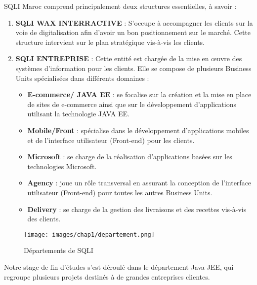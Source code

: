 
\vspace{0.5cm}
\indent SQLI Maroc comprend principalement deux structures essentielles, à savoir :

\begin{enumerate}
    \item \textbf{SQLI WAX INTERRACTIVE} : S’occupe à accompagner les clients sur la voie de digitalisation afin d’avoir un bon positionnement sur le marché. Cette structure
     intervient sur le plan stratégique vis-à-vis les clients.
     \item \textbf{SQLI ENTREPRISE} : Cette entité est chargée de la mise en œuvre des systèmes d'information pour les clients. Elle se compose de plusieurs Business Units spécialisées dans différents domaines :
\begin{itemize}

    \item \textbf{E-commerce/ JAVA EE} : se focalise sur la création et la mise en place de sites de e-commerce ainsi que sur le développement d'applications utilisant la technologie JAVA EE.
    \item \textbf{Mobile/Front} : spécialise dans le développement d'applications mobiles et de l'interface utilisateur (Front-end) pour les clients.
     \item \textbf{Microsoft} : se charge de la réalisation d'applications basées sur les technologies Microsoft.
      \item \textbf{Agency} : joue un rôle transversal en assurant la conception de l'interface utilisateur (Front-end) pour toutes les autres Business Units.
        \item \textbf{Delivery} : se charge de la gestion des livraisons et des recettes vis-à-vis des clients.       
\end{itemize}
\end{enumerate}
\vspace{0.5cm}
\begin{figure}[H]  
  \centering  
  \texttt{[image: images/chap1/departement.png]}
  \caption{Départements de SQLI}
  \label{Over The Air updates}
\end{figure}

\indent  Notre stage de fin d'études s'est déroulé dans le département Java JEE, qui regroupe plusieurs projets destinés à de grandes entreprises clientes.
